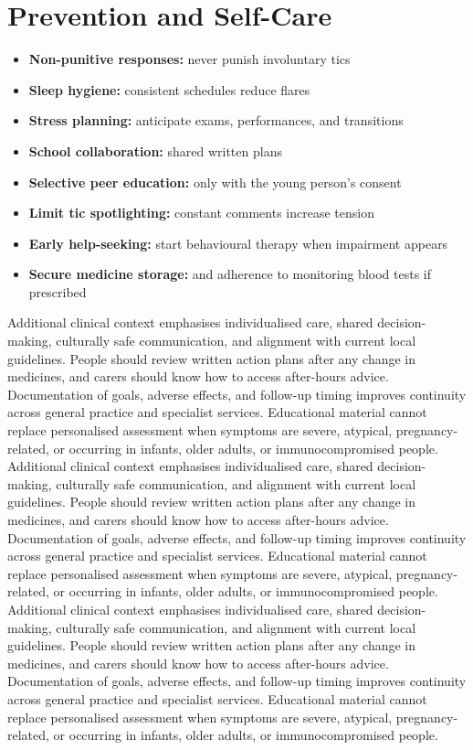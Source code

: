\section*{Prevention and Self-Care}
\begin{itemize}
    \item \textbf{Non-punitive responses:} never punish involuntary tics
    \item \textbf{Sleep hygiene:} consistent schedules reduce flares
    \item \textbf{Stress planning:} anticipate exams, performances, and transitions
    \item \textbf{School collaboration:} shared written plans
    \item \textbf{Selective peer education:} only with the young person's consent
    \item \textbf{Limit tic spotlighting:} constant comments increase tension
    \item \textbf{Early help-seeking:} start behavioural therapy when impairment appears
    \item \textbf{Secure medicine storage:} and adherence to monitoring blood tests if prescribed
\end{itemize} Additional clinical context emphasises individualised care, shared decision-making, culturally safe communication, and alignment with current local guidelines. People should review written action plans after any change in medicines, and carers should know how to access after-hours advice. Documentation of goals, adverse effects, and follow-up timing improves continuity across general practice and specialist services. Educational material cannot replace personalised assessment when symptoms are severe, atypical, pregnancy-related, or occurring in infants, older adults, or immunocompromised people. Additional clinical context emphasises individualised care, shared decision-making, culturally safe communication, and alignment with current local guidelines. People should review written action plans after any change in medicines, and carers should know how to access after-hours advice. Documentation of goals, adverse effects, and follow-up timing improves continuity across general practice and specialist services. Educational material cannot replace personalised assessment when symptoms are severe, atypical, pregnancy-related, or occurring in infants, older adults, or immunocompromised people. Additional clinical context emphasises individualised care, shared decision-making, culturally safe communication, and alignment with current local guidelines. People should review written action plans after any change in medicines, and carers should know how to access after-hours advice. Documentation of goals, adverse effects, and follow-up timing improves continuity across general practice and specialist services. Educational material cannot replace personalised assessment when symptoms are severe, atypical, pregnancy-related, or occurring in infants, older adults, or immunocompromised people.

